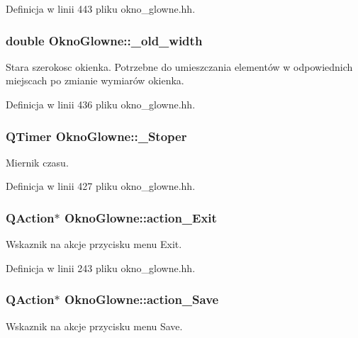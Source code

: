 Definicja w linii 443 pliku okno\-\_\-glowne.\-hh.

\hypertarget{class_okno_glowne_a6a0922607c0970ecdfe8adec7a773c7f}{
\subsubsection[{\-\_\-old\-\_\-width}]{\setlength{\rightskip}{0pt plus 5cm}double Okno\-Glowne\-::\-\_\-old\-\_\-width\hspace{0.3cm}{\ttfamily [private]}}}\label{class_okno_glowne_a6a0922607c0970ecdfe8adec7a773c7f}
Stara szerokosc okienka. Potrzebne do umieszczania elementów w odpowiednich miejscach po zmianie wymiarów okienka. 

Definicja w linii 436 pliku okno\-\_\-glowne.\-hh.

\hypertarget{class_okno_glowne_a5d047f90666212f58e69d11af3285d9b}{
\subsubsection[{\-\_\-\-Stoper}]{\setlength{\rightskip}{0pt plus 5cm}Q\-Timer Okno\-Glowne\-::\-\_\-\-Stoper\hspace{0.3cm}{\ttfamily [private]}}}\label{class_okno_glowne_a5d047f90666212f58e69d11af3285d9b}
Miernik czasu. 

Definicja w linii 427 pliku okno\-\_\-glowne.\-hh.

\hypertarget{class_okno_glowne_a579ef9901f57057368cb522ea5a9a5c3}{
\subsubsection[{action\-\_\-\-Exit}]{\setlength{\rightskip}{0pt plus 5cm}Q\-Action$\ast$ Okno\-Glowne\-::action\-\_\-\-Exit\hspace{0.3cm}{\ttfamily [private]}}}\label{class_okno_glowne_a579ef9901f57057368cb522ea5a9a5c3}
Wskaznik na akcje przycisku menu Exit. 

Definicja w linii 243 pliku okno\-\_\-glowne.\-hh.

\hypertarget{class_okno_glowne_a2c2d825b6e5e0faa5eb368be4fc73b78}{
\subsubsection[{action\-\_\-\-Save}]{\setlength{\rightskip}{0pt plus 5cm}Q\-Action$\ast$ Okno\-Glowne\-::action\-\_\-\-Save\hspace{0.3cm}{\ttfamily [private]}}}\label{class_okno_glowne_a2c2d825b6e5e0faa5eb368be4fc73b78}
Wskaznik na akcje przycisku menu Save. 

